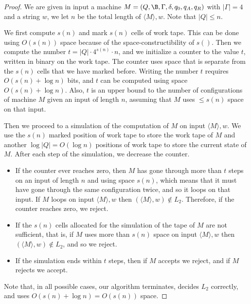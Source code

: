 \documentclass[11pt]{article}
\begin{document}
\begin{proof}
We are given in input a machine $M= (Q,\B,\Gamma,\delta,q_0,q_A,q_R)$ with
$|\Gamma | = 4$ and a string $w$, we let $n$ be the total length of 
$\langle M \rangle ,w$. Note that $|Q| \leq n$.

We first compute $s(n)$ and mark $s(n)$ cells of work tape. This can be
done using $O(s(n))$ space because of the space-constructibility of $s()$.
Then we compute the number $t = |Q|\cdot 4^{s(n)} \cdot n$, and we initialize a
counter to the value $t$, written in binary on the work tape.
The counter uses space that is separate from the $s(n)$ cells that we have marked before.
Writing the number $t$ requires $O(s(n) + \log n)$ bits, and $t$ can be
computed using space $O(s(n) + \log n)$. Also, $t$ is an upper bound
to the number of configurations of machine $M$ given an input of length $n$,
assuming that $M$ uses $\leq s(n)$ space on that input.

Then we proceed to a simulation of the computation of  $M$
on input   $\langle M \rangle ,w$. We use the $s(n)$ marked
position of work tape to store the work  tape of $M$ and another $\log |Q|
= O(\log n)$ positions of work tape to store the current state of $M$.
After each step of the simulation, we decrease the counter.

\begin{itemize}

\item If the counter ever reaches zero, then
$M$ has gone  through more than $t$ steps on an input of length $n$ and
using space $s(n)$, which means that it must have gone through the same configuration
twice, and so it loops on that input. If $M$ loops on input
$\langle M \rangle ,w$ then $(\langle M \rangle ,w)\not\in L_2$.
Therefore, if the counter reaches zero, we reject.

\item If the $s(n)$ cells allocated for the simulation of the tape 
of $M$ are not sufficient, that is, if $M$ uses more than $s(n)$
space on input $\langle M \rangle ,w$ then $(\langle M \rangle ,w)\not\in L_2$,
and so we reject.

\item If the simulation ends within $t$ steps, then if $M$ accepts we reject,
and if $M$ rejects we accept.

\end{itemize}

Note that, in all possible cases, our algorithm terminates, decides $L_2$ correctly,
and uses $O(s(n) + \log n) = O(s(n))$ space.
\end{proof}
\end{document}
